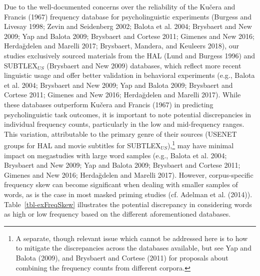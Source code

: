 \documentclass[
]{interact}
\begin{document}
Due to the well-documented concerns over the reliability of the Kučera
and Francis (1967) frequency database for psycholinguistic experiments
(Burgess and Livesay 1998; Zevin and Seidenberg 2002; Balota et al.
2004; Brysbaert and New 2009; Yap and Balota 2009; Brysbaert and Cortese
2011; Gimenes and New 2016; Herdağdelen and Marelli 2017; Brysbaert,
Mandera, and Keuleers 2018), our studies exclusively sourced materials
from the HAL (Lund and Burgess 1996) and SUBTLEX\(_{US}\) (Brysbaert and
New 2009) databases, which reflect more recent linguistic usage and
offer better validation in behavioral experiments (e.g., Balota et al.
2004; Brysbaert and New 2009; Yap and Balota 2009; Brysbaert and Cortese
2011; Gimenes and New 2016; Herdağdelen and Marelli 2017). While these
databases outperform Kučera and Francis (1967) in predicting
psycholinguistic task outcomes, it is important to note potential
discrepancies in individual frequency counts, particularly in the low
and mid-frequency ranges. This variation, attributable to the primary
genre of their sources (USENET groups for HAL and movie subtitles for
SUBTLEX\(_{US}\)),\footnote{A separate, though relevant issue which
  cannot be addressed here is to how to mitigate the discrepancies
  across the databases available, but see Yap and Balota (2009), and
  Brysbaert and Cortese (2011) for proposals about combining the
  frequency counts from different corpora.\label{fn-databases}} may have
minimal impact on megastudies with large word samples (e.g., Balota et
al. 2004; Brysbaert and New 2009; Yap and Balota 2009; Brysbaert and
Cortese 2011; Gimenes and New 2016; Herdağdelen and Marelli 2017).
However, corpus-specific frequency skew can become significant when
dealing with smaller samples of words, as is the case in most masked
priming studies (cf. Adelman et al. (2014)). Table~\ref{tbl-exFreqSkew}
illustrates the potential discrepancy in considering words as high or
low frequency based on the different aforementioned databases.
\end{document}
